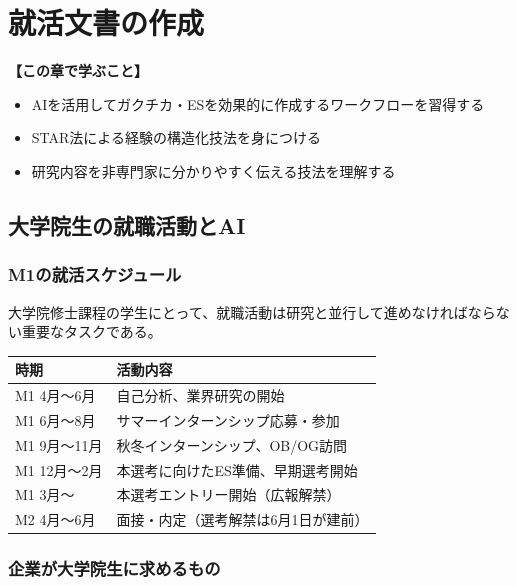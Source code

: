 \chapter{就活文書の作成}
\label{chap9}

\begin{chapterbox}
\textbf{【この章で学ぶこと】}
\begin{itemize}
\item AIを活用してガクチカ・ESを効果的に作成するワークフローを習得する
\item STAR法による経験の構造化技法を身につける
\item 研究内容を非専門家に分かりやすく伝える技法を理解する
\end{itemize}
\end{chapterbox}
\vspace{5mm}

\section{大学院生の就職活動とAI}

\subsection*{M1の就活スケジュール}

大学院修士課程の学生にとって、就職活動は研究と並行して進めなければならない重要なタスクである。

\begin{table}[H]
\centering
\begin{tabular}{ll}
\toprule
時期 & 活動内容 \\
\midrule
M1 4月〜6月 & 自己分析、業界研究の開始 \\
M1 6月〜8月 & サマーインターンシップ応募・参加 \\
M1 9月〜11月 & 秋冬インターンシップ、OB/OG訪問 \\
M1 12月〜2月 & 本選考に向けたES準備、早期選考開始 \\
M1 3月〜 & 本選考エントリー開始（広報解禁） \\
M2 4月〜6月 & 面接・内定（選考解禁は6月1日が建前） \\
\bottomrule
\end{tabular}
\end{table}

\subsection*{企業が大学院生に求めるもの}

